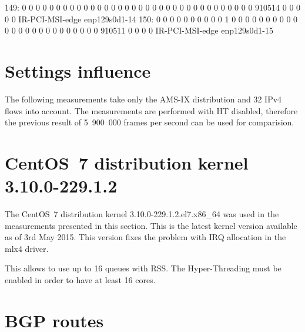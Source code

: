  149:          0          0          0          0          0          0          0          0          0          0          0          0          0          0          0          0          0          0          0          0          0          0          0          0          0          0          0          0          0          0          0          0          0          0     910514          0          0          0          0          0  IR-PCI-MSI-edge      enp129s0d1-14
 150:          0          0          0          0          0          0          0          0          0          0          1          0          0          0          0          0          0          0          0          0          0          0          0          0          0          0          0          0          0          0          0          0          0          0          0     910511          0          0          0          0  IR-PCI-MSI-edge      enp129s0d1-15
 

\section{Settings influence}

	
	
The following measurements take only the AMS-IX distribution and 32 IPv4 flows into account.
The measurements are performed with HT disabled,
therefore the previous result of 5~900~000 frames per second can be used for comparision.

	

	

	


\section{CentOS~7 distribution kernel 3.10.0-229.1.2}
The CentOS~7 distribution kernel 3.10.0-229.1.2.el7.x86\_64
was used in the measurements presented in this section.
This is the latest kernel version available as of 3rd May 2015.
This version fixes the problem with IRQ allocation in the mlx4 driver.

This allows to use up to 16 queues with RSS.
The Hyper-Threading must be enabled in order to have at least 16 cores.

\section{BGP routes}

	
